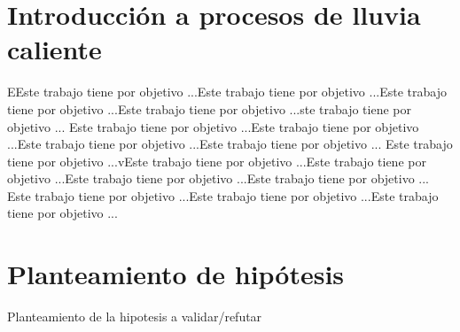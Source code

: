 \section{Introducción a procesos de lluvia caliente}
EEste trabajo tiene por objetivo ...Este trabajo tiene por objetivo ...Este trabajo tiene por objetivo ...Este trabajo tiene por objetivo ...ste trabajo tiene por objetivo ...
Este trabajo tiene por objetivo ...Este trabajo tiene por objetivo ...Este trabajo tiene por objetivo ...Este trabajo tiene por objetivo ...
Este trabajo tiene por objetivo ...vEste trabajo tiene por objetivo ...Este trabajo tiene por objetivo ...Este trabajo tiene por objetivo ...Este trabajo tiene por objetivo ...
Este trabajo tiene por objetivo ...Este trabajo tiene por objetivo ...Este trabajo tiene por objetivo ...
\section{Planteamiento de hipótesis}
Planteamiento de la hipotesis a validar/refutar